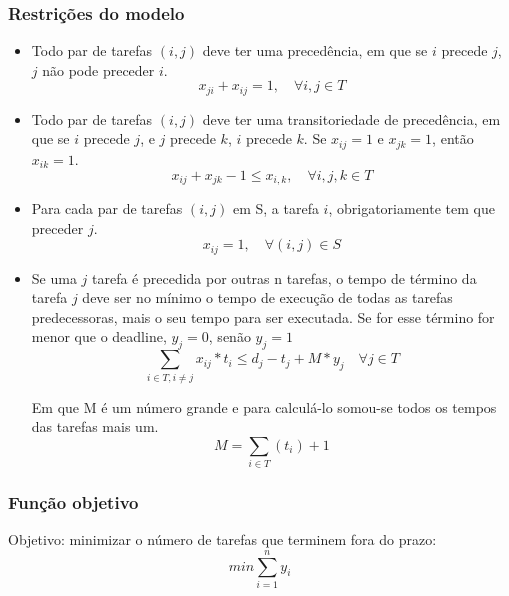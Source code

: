\documentclass[11pt,letterpaper]{article}
\begin{document}
\subsubsection*{Restrições do modelo}
\begin{itemize}

\item Todo par de tarefas $(i,j)$ deve ter uma precedência, em que se $i$
  precede $j$, $j$ não pode preceder $i$. 
  \begin{equation*}
    x_{ji}+x_{ij}=1, \quad\forall i,j \in T
  \end{equation*}

\item Todo par de tarefas $(i,j)$ deve ter uma transitoriedade de precedência, em que se $i$
  precede $j$, e $j$ precede $k$, $i$ precede $k$. Se $x_{ij}=1$ e
  $x_{jk}=1$, então $x_{ik}=1$.
  \begin{equation*}
    x_{ij}+x_{jk}-1 \leq x_{i,k}, \quad \forall i,j,k \in T
  \end{equation*}


\item Para cada par de tarefas $(i,j)$ em S, a tarefa $i$,
  obrigatoriamente tem que preceder $j$. 
  \begin{equation*}
    x_{ij} = 1,\quad \forall (i,j) \in S
  \end{equation*}

\item Se uma $j$ tarefa é precedida por outras n tarefas, o tempo de
  término da tarefa $j$ deve ser no mínimo o tempo de execução de todas
  as tarefas predecessoras, mais o seu tempo para ser executada. Se
  for esse término for menor que o deadline, $y_{j}=0$, senão $y_{j}=1$ 
  \begin{equation*}
    \sum_{i \in T, i \neq j} x_{ij}*t_{i} \leq d_{j}-t_{j}+ M*y_{j}\quad \forall j \in T
  \end{equation*}
  
  Em que M é um número grande e para calculá-lo somou-se todos os tempos
  das tarefas mais um. 
  \begin{equation*}
    M = \sum_{i \in T} (t_{i}) +1
  \end{equation*}
  
\end{itemize}

\subsubsection*{Função objetivo}
Objetivo: minimizar o número de tarefas que terminem fora do prazo:
\begin{equation}
  min\sum_{i=1}^{n}y_i
\end{equation}
\end{document}
